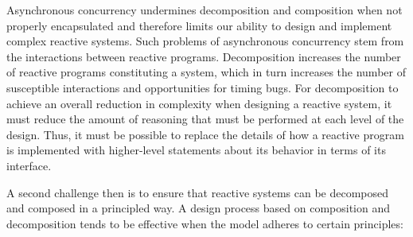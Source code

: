 Asynchronous concurrency undermines decomposition and composition when not properly encapsulated and therefore limits our ability to design and implement complex reactive systems.
Such problems of asynchronous concurrency stem from the interactions between reactive programs.
Decomposition increases the number of reactive programs constituting a system, which in turn increases the number of susceptible interactions and opportunities for timing bugs.
For decomposition to achieve an overall reduction in complexity when designing a reactive system, it must reduce the amount of reasoning that must be performed at each level of the design.
Thus, it must be possible to replace the details of how a reactive program is implemented with higher-level statements about its behavior in terms of its interface.

A second challenge then is to ensure that reactive systems can be decomposed and composed in a principled way.
A design process based on composition and decomposition tends to be effective when the model adheres to certain principles:
